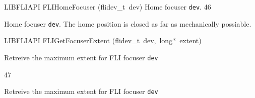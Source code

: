 \documentclass{article}
\begin{document}
\begin{cxxfunction}
{LIBFLIAPI}
        {FLIHomeFocuser}
        {(flidev\_t\ dev)}
        {
 Home focuser \texttt{dev}.}
        {46}
\begin{cxxdoc}

Home focuser \texttt{dev}. The home position is closed as far as mechanically possiable.


\end{cxxdoc}
\end{cxxfunction}
\begin{cxxfunction}
{LIBFLIAPI}
        {FLIGetFocuserExtent}
        {(flidev\_t\ dev,\ long*\ extent)}
        {
 Retreive the maximum extent for FLI focuser \texttt{dev}
 
 }
        {47}
\begin{cxxdoc}

Retreive the maximum extent for FLI focuser \texttt{dev}


\end{cxxdoc}
\end{cxxfunction}
\end{document}
